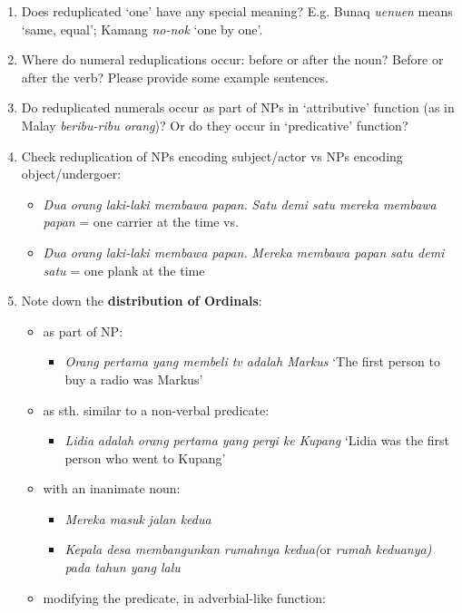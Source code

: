 \begin{enumerate}
\item Does reduplicated `one' have any special meaning? E.g. Bunaq \textit{uen{\Tilde}uen} means `same, equal'; Kamang \textit{no-nok} `one by one'.
\item Where do numeral reduplications occur: before or after the noun? Before or after the verb? Please provide some example sentences.
\item Do reduplicated numerals occur as part of NPs in `attributive' function (as in Malay \textit{beribu-ribu orang})? Or do they occur in `predicative' function? 
\item  Check reduplication of NPs encoding subject/actor vs NPs encoding object/undergoer: 
\begin{itemize}
\item \textit{Dua orang laki-laki membawa papan.} \textit{Satu demi satu mereka membawa papan} = one carrier at the time vs. 
\item \textit{Dua orang laki-laki membawa papan.} \textit{Mereka membawa papan} \textit{satu demi satu} = one plank at the time
\end{itemize}
\item  Note down the \textbf{distribution of Ordinals}: 
\begin{itemize}
\item as part of NP: 
\begin{itemize}
\item \textit{Orang pertama yang membeli tv adalah Markus} `The first person to buy a radio was Markus'  
\end{itemize}
\item as sth. similar to a non-verbal predicate: 
\begin{itemize}
\item \textit{Lidia} \textit{adalah} \textit{orang pertama yang pergi ke Kupang} `Lidia was the first person who went to Kupang' 
\end{itemize}
\item with an inanimate noun: 
\begin{itemize}
\item \textit{Mereka masuk} \textit{jalan kedua}
\item \textit{Kepala desa membangunkan} \textit{rumahnya kedua}\textit{(}or \textit{rumah keduanya}\textit{) pada tahun yang lalu } 
\end{itemize}
\item modifying the predicate, in adverbial-like function: 

\end{itemize}
\end{enumerate}
